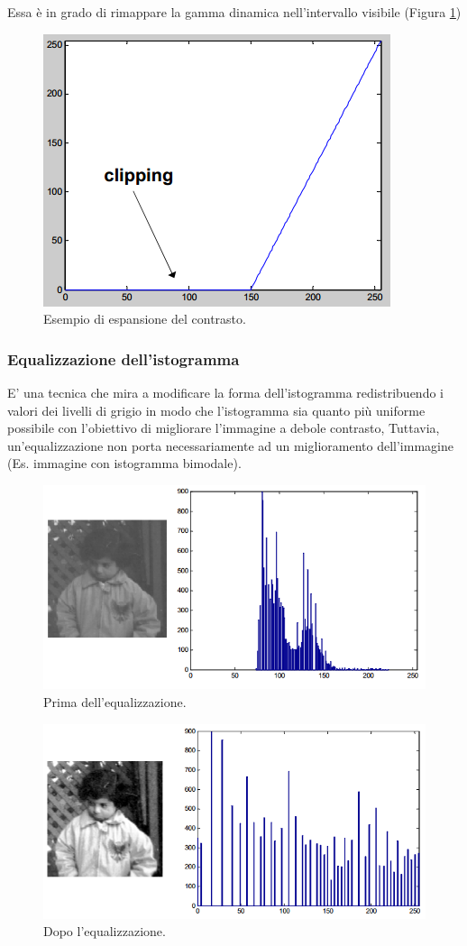 Essa è in grado di rimappare la gamma dinamica nell'intervallo visibile (Figura \ref{fig:espansione-contrasto})

\begin{figure}
\centering
\includegraphics[width=.5\textwidth]{img/espansione-contrasto.png}
\caption{Esempio di espansione del contrasto.}\label{fig:espansione-contrasto}
\end{figure}

\subsubsection{Equalizzazione dell'istogramma}
E’ una tecnica che mira a modificare la forma 
dell'istogramma redistribuendo i valori dei 
livelli di grigio in modo che l'istogramma sia 
quanto più uniforme possibile con l'obiettivo  di migliorare l'immagine a 
debole contrasto, Tuttavia, un'equalizzazione non porta 
necessariamente ad un miglioramento dell'immagine (Es. immagine con istogramma 
bimodale).
\begin{figure}
\centering
\includegraphics[width=.5\textwidth]{img/equalizzazione-prima.png}
\caption{Prima dell'equalizzazione.}
\label{fig:equalizzazione-prima}
\end{figure}

\begin{figure}
\centering
\includegraphics[width=.5\textwidth]{img/equalizzazione-dopo.png}
\caption{Dopo l'equalizzazione.}
\label{fig:equalizzazione-dopo.}
\end{figure}

